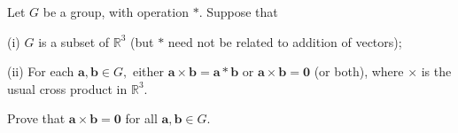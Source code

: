 Let $G$ be a group, with operation $*$. Suppose that

(i) $G$ is a subset of $\mathbb{R}^3$ (but $*$ need not be related to addition of vectors);

(ii) For each $\mathbf{a},\mathbf{b}\in G,$ either $\mathbf{a}\times\mathbf{b}=\mathbf{a}*\mathbf{b}$ or $\mathbf{a}\times\mathbf{b}=\mathbf{0}$ (or both), where $\times$ is the usual cross product in $\mathbb{R}^3.$

Prove that $\mathbf{a}\times\mathbf{b}=\mathbf{0}$ for all $\mathbf{a},\mathbf{b}\in G.$